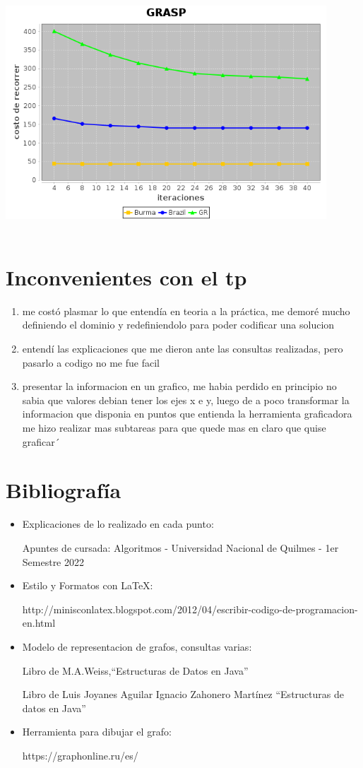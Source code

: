 \documentclass[a4paper,11pt]{article}
\begin{document}
\includegraphics[width=12cm, height=9cm]{grafico.jpg}


\section{Inconvenientes con el tp}
\begin{enumerate}
  \item me costó plasmar lo que entendía en teoria a la práctica, me demoré mucho definiendo el dominio y redefiniendolo para poder codificar una solucion
  \item entendí las explicaciones que me dieron ante las consultas realizadas, pero pasarlo a codigo no me fue facil
  \item presentar la informacion en un grafico, me habia perdido en principio no sabia que valores debian tener los ejes x e y, luego de a poco transformar la informacion que disponia en puntos que entienda la herramienta graficadora me hizo realizar mas subtareas para que quede mas en claro que quise graficar´
\end{enumerate}
\section{Bibliografía}
\begin{itemize}
  \item Explicaciones de lo realizado en cada punto:
  
  Apuntes de cursada: Algoritmos - Universidad Nacional de Quilmes - 1er Semestre 2022
  \item Estilo y Formatos con LaTeX:
  
   http://minisconlatex.blogspot.com/2012/04/escribir-codigo-de-programacion-en.html
   \item Modelo de representacion de grafos, consultas varias:
   
   Libro de M.A.Weiss,“Estructuras de Datos en Java” 
   
   Libro de Luis Joyanes Aguilar
Ignacio Zahonero Martínez  “Estructuras de datos en Java”  
   
   \item Herramienta para dibujar el grafo:
   
   https://graphonline.ru/es/
\end{itemize}
\end{document}
